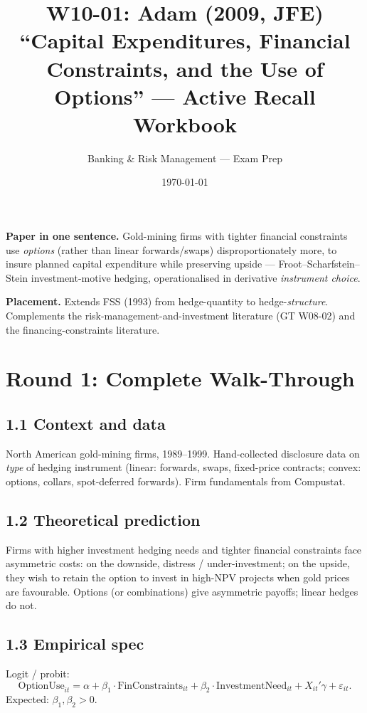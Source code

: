 \documentclass[11pt]{article}
\title{W10-01: Adam (2009, JFE) \\
\large ``Capital Expenditures, Financial Constraints, and the Use of Options'' --- Active Recall Workbook}
\author{Banking \& Risk Management --- Exam Prep}
\date{\today}
\begin{document}
\maketitle

\begin{keybox}
\textbf{Paper in one sentence.} Gold-mining firms with tighter financial constraints use \emph{options} (rather than linear forwards/swaps) disproportionately more, to insure planned capital expenditure while preserving upside --- Froot--Scharfstein--Stein investment-motive hedging, operationalised in derivative \emph{instrument choice}.

\textbf{Placement.} Extends FSS (1993) from hedge-quantity to hedge-\emph{structure}. Complements the risk-management-and-investment literature (GT W08-02) and the financing-constraints literature.
\end{keybox}

\section*{Round 1: Complete Walk-Through}

\subsection*{1.1 Context and data}
North American gold-mining firms, 1989--1999. Hand-collected disclosure data on \emph{type} of hedging instrument (linear: forwards, swaps, fixed-price contracts; convex: options, collars, spot-deferred forwards). Firm fundamentals from Compustat.

\subsection*{1.2 Theoretical prediction}
Firms with higher investment hedging needs and tighter financial constraints face asymmetric costs: on the downside, distress / under-investment; on the upside, they wish to retain the option to invest in high-NPV projects when gold prices are favourable. Options (or combinations) give asymmetric payoffs; linear hedges do not.

\subsection*{1.3 Empirical spec}
Logit / probit:
\[
\text{OptionUse}_{it} = \alpha + \beta_1 \cdot \text{FinConstraints}_{it} + \beta_2 \cdot \text{InvestmentNeed}_{it} + X_{it}'\gamma + \varepsilon_{it}.
\]
Expected: $\beta_1, \beta_2 > 0$.
\end{document}
